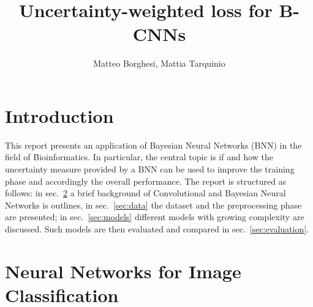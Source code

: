 \documentclass[11pt,twoside,a4paper]{article}
\begin{document}
\title{Uncertainty-weighted loss for B-CNNs}
\author{Matteo Borghesi, Mattia Tarquinio}
\maketitle

\section{Introduction}
This report presents an application of Bayesian Neural Networks (BNN) in the field of Bioinformatics. In particular, the central topic is if and how the uncertainty measure provided by a BNN can be used to improve the training phase and accordingly the overall performance.\newline
The report is structured as follows: in sec.~\ref{sec:NN} a brief background of Convolutional and Bayesian Neural Networks is outlines, in sec.~\ref{sec:data} the dataset and the preprocessing phase are presented; in sec.~\ref{sec:models} different models with growing complexity are discussed. Such models are then evaluated and compared in sec.~\ref{sec:evaluation}.

\section{Neural Networks for Image Classification}
\label{sec:NN}
\end{document}
